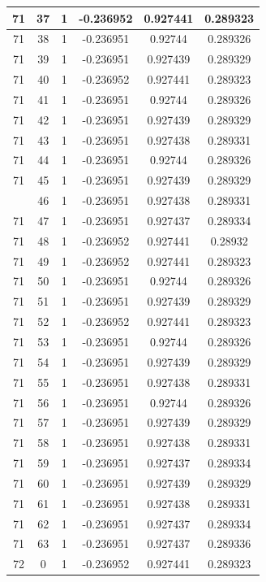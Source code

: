 \documentclass[12pt,a4paper]{article}
\numberwithin{equation}{section}
\numberwithin{figure}{section}
\numberwithin{table}{section}
\begin{document}
\begin{longtable}{|c|c|c|c|c|c|}
71 & 37 & 1 & -0.236952 & 0.927441 & 0.289323 \\ \hline
71 & 38 & 1 & -0.236951 & 0.92744 & 0.289326 \\ \hline
71 & 39 & 1 & -0.236951 & 0.927439 & 0.289329 \\ \hline
71 & 40 & 1 & -0.236952 & 0.927441 & 0.289323 \\ \hline
71 & 41 & 1 & -0.236951 & 0.92744 & 0.289326 \\ \hline
71 & 42 & 1 & -0.236951 & 0.927439 & 0.289329 \\ \hline
71 & 43 & 1 & -0.236951 & 0.927438 & 0.289331 \\ \hline
71 & 44 & 1 & -0.236951 & 0.92744 & 0.289326 \\ \hline
71 & 45 & 1 & -0.236951 & 0.927439 & 0.289329 \\ \hline
\pagebreak
71 & 46 & 1 & -0.236951 & 0.927438 & 0.289331 \\ \hline
71 & 47 & 1 & -0.236951 & 0.927437 & 0.289334 \\ \hline
71 & 48 & 1 & -0.236952 & 0.927441 & 0.28932 \\ \hline
71 & 49 & 1 & -0.236952 & 0.927441 & 0.289323 \\ \hline
71 & 50 & 1 & -0.236951 & 0.92744 & 0.289326 \\ \hline
71 & 51 & 1 & -0.236951 & 0.927439 & 0.289329 \\ \hline
71 & 52 & 1 & -0.236952 & 0.927441 & 0.289323 \\ \hline
71 & 53 & 1 & -0.236951 & 0.92744 & 0.289326 \\ \hline
71 & 54 & 1 & -0.236951 & 0.927439 & 0.289329 \\ \hline
71 & 55 & 1 & -0.236951 & 0.927438 & 0.289331 \\ \hline
71 & 56 & 1 & -0.236951 & 0.92744 & 0.289326 \\ \hline
71 & 57 & 1 & -0.236951 & 0.927439 & 0.289329 \\ \hline
71 & 58 & 1 & -0.236951 & 0.927438 & 0.289331 \\ \hline
71 & 59 & 1 & -0.236951 & 0.927437 & 0.289334 \\ \hline
71 & 60 & 1 & -0.236951 & 0.927439 & 0.289329 \\ \hline
71 & 61 & 1 & -0.236951 & 0.927438 & 0.289331 \\ \hline
71 & 62 & 1 & -0.236951 & 0.927437 & 0.289334 \\ \hline
71 & 63 & 1 & -0.236951 & 0.927437 & 0.289336 \\ \hline
72 & 0 & 1 & -0.236952 & 0.927441 & 0.289323 \\ \hline

\end{longtable}
\end{document}

